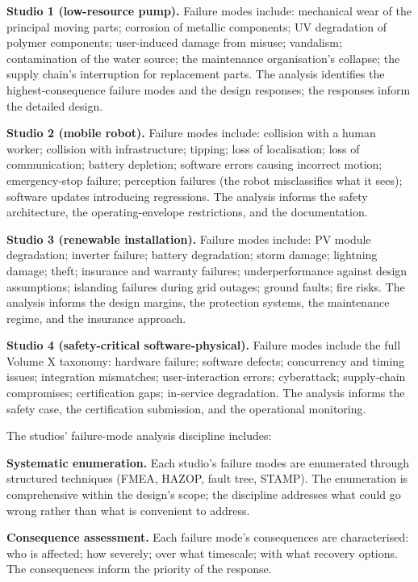 \textbf{Studio 1 (low-resource pump).} Failure modes include: mechanical wear of the principal moving parts; corrosion of metallic components; UV degradation of polymer components; user-induced damage from misuse; vandalism; contamination of the water source; the maintenance organisation's collapse; the supply chain's interruption for replacement parts. The analysis identifies the highest-consequence failure modes and the design responses; the responses inform the detailed design.

\textbf{Studio 2 (mobile robot).} Failure modes include: collision with a human worker; collision with infrastructure; tipping; loss of localisation; loss of communication; battery depletion; software errors causing incorrect motion; emergency-stop failure; perception failures (the robot misclassifies what it sees); software updates introducing regressions. The analysis informs the safety architecture, the operating-envelope restrictions, and the documentation.

\textbf{Studio 3 (renewable installation).} Failure modes include: PV module degradation; inverter failure; battery degradation; storm damage; lightning damage; theft; insurance and warranty failures; underperformance against design assumptions; islanding failures during grid outages; ground faults; fire risks. The analysis informs the design margins, the protection systems, the maintenance regime, and the insurance approach.

\textbf{Studio 4 (safety-critical software-physical).} Failure modes include the full Volume X taxonomy: hardware failure; software defects; concurrency and timing issues; integration mismatches; user-interaction errors; cyberattack; supply-chain compromises; certification gaps; in-service degradation. The analysis informs the safety case, the certification submission, and the operational monitoring.

The studios' failure-mode analysis discipline includes:

\textbf{Systematic enumeration.} Each studio's failure modes are enumerated through structured techniques (FMEA, HAZOP, fault tree, STAMP). The enumeration is comprehensive within the design's scope; the discipline addresses what could go wrong rather than what is convenient to address.

\textbf{Consequence assessment.} Each failure mode's consequences are characterised: who is affected; how severely; over what timescale; with what recovery options. The consequences inform the priority of the response.

